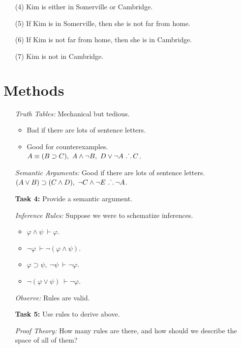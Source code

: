 \documentclass[a4paper, 11pt]{article} %
\def\therefore{\ensuremath{\ldotp\dot{}\,\ldotp}}
\begin{document}
\begin{enumerate}
  \item[(4)] Kim is either in Somerville or Cambridge.
  \item[(5)] If Kim is in Somerville, then she is not far from home.
  \item[(6)] If Kim is not far from home, then she is in Cambridge.
  \item[(7)] Kim is not in Cambridge.
\end{enumerate}






\section*{Methods}

\begin{enumerate}[leftmargin=1.2in,labelsep=.15in] %
  \item[\it Truth Tables:] Mechanical but tedious.
  \begin{itemize}
    \item Bad if there are lots of sentence letters.
    \item Good for counterexamples.\\
      $A \equiv (B \supset C),\ A \wedge \neg B,\ D \vee \neg A\ \therefore C$.
  \end{itemize}
  \item[\it Semantic Arguments:] Good if there are lots of sentence letters.\\
        $(A \vee B) \supset (C \wedge D),\ \neg C \wedge \neg E\ \therefore \neg A$.
  \item[\bf Task 4:] Provide a semantic argument.
  \item[\it Inference Rules:] Suppose we were to schematize inferences.
    \begin{itemize}
      \item $\varphi \wedge \psi\ \vdash \varphi$.
      \item $\neg \varphi\ \vdash \neg(\varphi \wedge \psi)$.
      \item $\varphi \supset \psi,\ \neg \psi\ \vdash \neg \varphi$.
      \item $\neg(\varphi \vee \psi)\ \vdash \neg \varphi$.
    \end{itemize}
  \item[\it Observe:] Rules are valid.
  \item[\bf Task 5:] Use rules to derive above.
  \item[\it Proof Theory:] How many rules are there, and how should we describe the space of all of them?
\end{enumerate}









%
\end{document}
